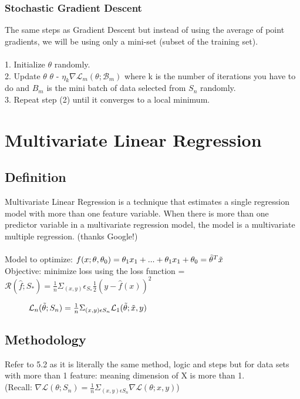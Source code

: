 \documentclass[a4paper]{article}
\begin{document}
\subsubsection{Stochastic Gradient Descent}
The same steps as Gradient Descent but instead of using the average of point gradients, we will be using only a mini-set (subset of the training set).\\  \\
1. Initialize $\theta$ randomly. \\
2. Update $\theta$ \leftarrow  $\theta$ - $\eta_k \nabla \mathcal{L}_m (\theta; \mathcal{B}_m)$ where k is the number of iterations you have to do and $B_m$ is the mini batch of data selected from $S_n$ randomly.\\
3. Repeat step (2) until it converges to a local minimum.\\

\section{Multivariate Linear Regression}

\subsection{Definition} %
Multivariate Linear Regression is a technique that estimates a single regression model with more than one feature variable. When there is more than one predictor variable in a multivariate regression model, the model is a multivariate multiple regression. (thanks Google!) \\ \\ 
Model to optimize:
$f(x; \theta,\theta_0) = \theta_1 x_1 + ... + \theta_1 x_1 + \theta_0 = \Tilde{\theta}^T \Tilde{x}$ \\
Objective: minimize loss using the loss function =
$\mathcal{R}(\hat{f}; S_*) = \frac{1}{n}\Sigma _(x,y)\epsilon _{S_*} \frac{1}{2}(y - \hat{f}(x))^2$\\
\begin{figure}[h]
    \centering
$\mathcal{L}_n(\Tilde{\theta} ; S_n) = \frac{1}{n} \Sigma_{(x,y)\epsilon S_n}  \mathcal{L}_1 (\Tilde{\theta} ; \Tilde{x},y)$%
    \end{figure}

\subsection{Methodology}
Refer to 5.2 as it is literally the same method, logic and steps but for data sets with more than 1 feature: meaning dimension of X is more than 1.
\\(Recall: $\nabla \mathcal{L}(\theta ; S_n) = \frac{1}{n} \Sigma_{(x,y)\epsilon S_n} \nabla \mathcal{L}(\theta ; x,y)$)
\end{document}
